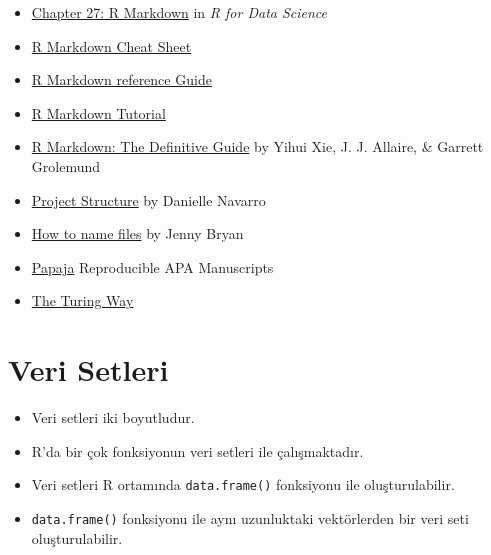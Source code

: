 \documentclass[
  oneside]{book}
\providecommand{\tightlist}{%
  \setlength{\itemsep}{0pt}\setlength{\parskip}{0pt}}
\begin{document}
\begin{itemize}
\tightlist
\item
  \href{http://r4ds.had.co.nz/r-markdown.html}{Chapter 27: R Markdown} in \emph{R for Data Science}
\item
  \href{https://github.com/rstudio/cheatsheets/raw/master/rmarkdown.pdf}{R Markdown Cheat Sheet}
\item
  \href{https://www.rstudio.com/wp-content/uploads/2015/03/rmarkdown-reference.pdf}{R Markdown reference Guide}
\item
  \href{https://rmarkdown.rstudio.com/lesson-1.html}{R Markdown Tutorial}
\item
  \href{https://bookdown.org/yihui/rmarkdown/}{R Markdown: The Definitive Guide} by Yihui Xie, J. J. Allaire, \& Garrett Grolemund
\item
  \href{https://slides.djnavarro.net/project-structure/}{Project Structure} by Danielle Navarro
\item
  \href{https://speakerdeck.com/jennybc/how-to-name-files}{How to name files} by Jenny Bryan
\item
  \href{https://crsh.github.io/papaja_man/}{Papaja} Reproducible APA Manuscripts
\item
  \href{https://the-turing-way.netlify.app/}{The Turing Way}
\end{itemize}

\hypertarget{veri-setleri}{%
\chapter{Veri Setleri}\label{veri-setleri}}

\begin{itemize}
\item
  Veri setleri iki boyutludur.
\item
  R'da bir çok fonksiyonun veri setleri ile çalışmaktadır.
\item
  Veri setleri R ortamında \texttt{data.frame()} fonksiyonu ile oluşturulabilir.
\item
  \texttt{data.frame()} fonksiyonu ile aynı uzunluktaki vektörlerden bir veri seti oluşturulabilir.
\end{itemize}
\end{document}
